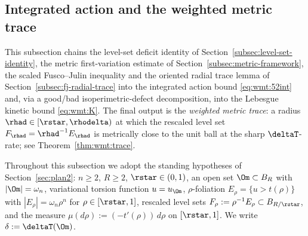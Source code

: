 %
%

\subsection{Integrated action and the weighted metric trace}\label{subsec:weighted-metric-trace}

This subsection chains the level-set deficit identity of
Section~\ref{subsec:level-set-identity}, the metric first-variation
estimate of Section~\ref{subsec:metric-framework}, the scaled
Fusco--Julin inequality and the oriented radial trace lemma of
Section~\ref{subsec:fj-radial-trace} into the integrated action bound
\eqref{eq:wmt:52int} and, via a good/bad isoperimetric-defect
decomposition, into the Lebesgue kinetic bound \eqref{eq:wmt:K}. The
final output is the \emph{weighted metric trace}: a radius
$\rhad\in[\rstar,\rhodelta)$ at which the rescaled level set
$F_\rhad=\rhad^{-1}E_\rhad$ is metrically close to the unit ball at the
sharp $\deltaT$-rate; see Theorem~\ref{thm:wmt:trace}.

Throughout this subsection we adopt the standing hypotheses of
Section~\ref{sec:plan2}: $n\ge 2$, $R\ge 2$, $\rstar\in(0,1)$, an open set
$\Om\subset B_R$ with $|\Om|=\omega_n$, variational torsion function
$u=u_\Om$, $\rho$-foliation $E_\rho=\{u>t(\rho)\}$ with
$|E_\rho|=\omega_n\rho^n$ for $\rho\in[\rstar,1]$, rescaled level sets
$F_\rho:=\rho^{-1}E_\rho\subset B_{R/\rstar}$, and the measure
$\mu(d\rho):=(-t'(\rho))\,d\rho$ on $[\rstar,1]$. We write
$\delta:=\deltaT(\Om)$.

